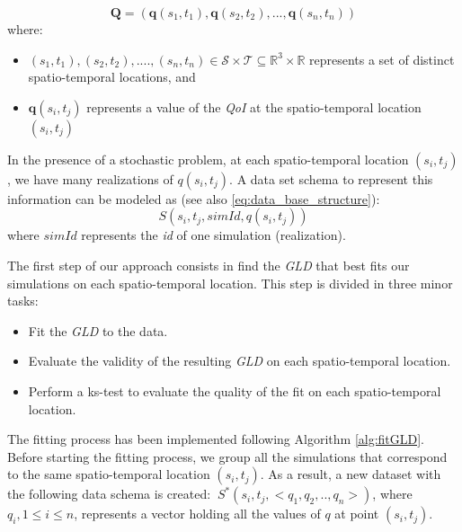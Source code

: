 \begin{equation} \label{eq:spatio_temporal}
\mathbf{Q} = (\mathbf{q}(s_{1},t_{1}),\mathbf{q}(s_{2},t_{2}),...,\mathbf{q}(s_{n},t_{n}))  
\end{equation}
where:
\begin{itemize}
\item $(s_{1},t_{1}),(s_{2},t_{2}),....,(s_{n},t_{n}) \in \mathcal{S} \times \mathcal{T}\subseteq\mathbb{R}^{3}\times\mathbb{R}$ represents a set of distinct spatio-temporal locations, and
\item $\mathbf{q}(s_{i},t_{j})$ represents a value of the \textit{QoI} at the spatio-temporal location $(s_{i},t_{j})$
\end{itemize}

In the presence of a stochastic problem, at each spatio-temporal location $(s_{i},t_{j})$, we have many realizations of $q(s_{i},t_{j})$. A data set schema to represent this information can be modeled as (see also \ref{eq:data_base_structure}):
\begin{equation}
S(s_{i},t_{j},simId,q(s_{i},t_{j}))
\end{equation}
where $simId$ represents the \textit{id} of one simulation (realization).

The first step of our approach consists in find the \textit{GLD} that best fits our simulations on each spatio-temporal location. This step is divided in three minor tasks:
\begin{itemize}
\item Fit the \textit{GLD} to the data.
\item Evaluate the validity of the resulting \textit{GLD} on each spatio-temporal location.
\item Perform a ks-test to evaluate the quality of the fit on each spatio-temporal location.
\end{itemize}

The fitting process has been implemented following Algorithm \ref{alg:fitGLD}. Before starting the fitting process, we group all the simulations that correspond to the same spatio-temporal location $(s_{i},t_{j})$.  As a result, a new dataset with the following data schema is created: $\ S^*(s_{i},t_{j},<q_1,q_2,..,q_n>)$, where $q_i, 1 \le i \le n$, represents a vector holding all the values of $q$ at point $(s_{i},t_{j})$.

